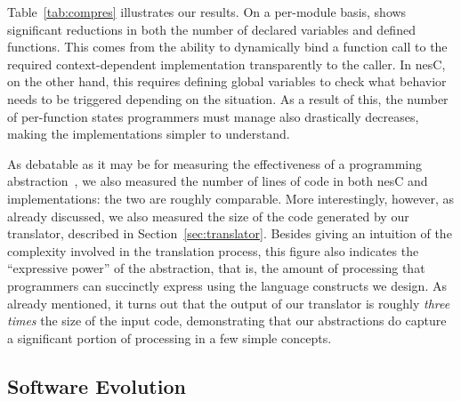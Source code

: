  Table~\ref{tab:compres} illustrates our results. On
a per-module basis, \conesc shows significant reductions in both the
number of declared variables and defined functions. This comes from
the ability to dynamically bind a function call to the required
context-dependent implementation transparently to the caller. In nesC,
on the other hand, this requires defining global variables to check
what behavior needs to be triggered depending on the situation. As a
result of this, the number of per-function states programmers must
manage also drastically decreases, making the implementations simpler
to understand. %



As debatable as it may be for measuring the effectiveness of a
programming abstraction~\cite{mottola10:survey}, we also measured the
number of lines of code in both nesC and \conesc implementations: the
two are roughly comparable. More interestingly, however, as already
discussed, we also measured the size of the code generated by our
translator, described in Section~\ref{sec:translator}. Besides giving
an intuition of the complexity involved in the translation process,
this figure also indicates the ``expressive power'' of the
abstraction, that is, the amount of processing that \conesc
programmers can succinctly express using the language constructs we
design. As already mentioned, it turns out that the output of our
translator is roughly \emph{three times} the size of the input code,
demonstrating that our abstractions do capture a significant portion
of processing in a few simple concepts.

\subsection{Software Evolution}\label{sec:evolve}


